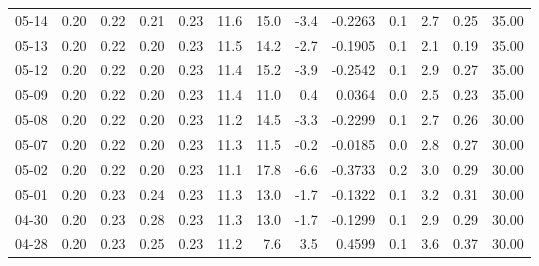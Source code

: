 \begin{threeparttable}
{\begin{tabular}{lrrrrrrrrrrrr}
  05-14 &          0.20 &          0.22 &          0.21 &        0.23 &                11.6 &                15.0 &       -3.4 &      -0.2263 &                 0.1 &              2.7 &            0.25 &                  35.00 \\
  05-13 &          0.20 &          0.22 &          0.20 &        0.23 &                11.5 &                14.2 &       -2.7 &      -0.1905 &                 0.1 &              2.1 &            0.19 &                  35.00 \\
  05-12 &          0.20 &          0.22 &          0.20 &        0.23 &                11.4 &                15.2 &       -3.9 &      -0.2542 &                 0.1 &              2.9 &            0.27 &                  35.00 \\
  05-09 &          0.20 &          0.22 &          0.20 &        0.23 &                11.4 &                11.0 &        0.4 &       0.0364 &                 0.0 &              2.5 &            0.23 &                  35.00 \\
  05-08 &          0.20 &          0.22 &          0.20 &        0.23 &                11.2 &                14.5 &       -3.3 &      -0.2299 &                 0.1 &              2.7 &            0.26 &                  30.00 \\
  05-07 &          0.20 &          0.22 &          0.20 &        0.23 &                11.3 &                11.5 &       -0.2 &      -0.0185 &                 0.0 &              2.8 &            0.27 &                  30.00 \\
  05-02 &          0.20 &          0.22 &          0.20 &        0.23 &                11.1 &                17.8 &       -6.6 &      -0.3733 &                 0.2 &              3.0 &            0.29 &                  30.00 \\
  05-01 &          0.20 &          0.23 &          0.24 &        0.23 &                11.3 &                13.0 &       -1.7 &      -0.1322 &                 0.1 &              3.2 &            0.31 &                  30.00 \\
  04-30 &          0.20 &          0.23 &          0.28 &        0.23 &                11.3 &                13.0 &       -1.7 &      -0.1299 &                 0.1 &              2.9 &            0.29 &                  30.00 \\
  04-28 &          0.20 &          0.23 &          0.25 &        0.23 &                11.2 &                 7.6 &        3.5 &       0.4599 &                 0.1 &              3.6 &            0.37 &                  30.00 \\

\end{tabular}}
\end{threeparttable}

